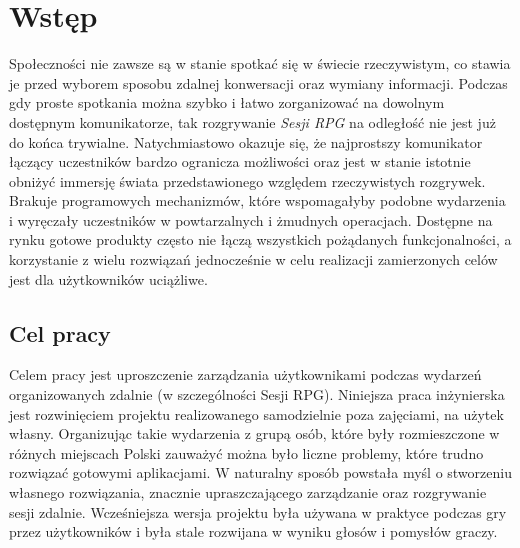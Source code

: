 \documentclass[shortabstract,inz]{iithesis}
\author{Mateusz Zając}
\begin{document}
	\chapter*{Wstęp}
		Społeczności nie zawsze są w stanie spotkać się w świecie rzeczywistym, co stawia je przed wyborem sposobu zdalnej konwersacji oraz wymiany informacji. Podczas gdy proste spotkania można szybko i łatwo zorganizować na dowolnym dostępnym komunikatorze, tak rozgrywanie \textit{Sesji RPG}\cite{sesjarpg} na odległość nie jest już do końca trywialne. Natychmiastowo okazuje się, że najprostszy komunikator łączący uczestników bardzo ogranicza możliwości oraz jest w stanie istotnie obniżyć immersję świata przedstawionego względem rzeczywistych rozgrywek. Brakuje programowych mechanizmów, które wspomagałyby podobne wydarzenia i wyręczały uczestników w powtarzalnych i żmudnych operacjach. Dostępne na rynku gotowe produkty często nie łączą wszystkich pożądanych funkcjonalności, a korzystanie z wielu rozwiązań jednocześnie w celu realizacji zamierzonych celów jest dla użytkowników uciążliwe. 
		
		\section*{Cel pracy}
		Celem pracy jest uproszczenie zarządzania użytkownikami podczas wydarzeń organizowanych zdalnie (w szczególności Sesji RPG).
		Niniejsza praca inżynierska jest rozwinięciem projektu realizowanego samodzielnie poza zajęciami, na użytek własny. Organizując takie wydarzenia z grupą osób, które były rozmieszczone w różnych miejscach Polski zauważyć można było liczne problemy, które trudno rozwiązać gotowymi aplikacjami. W naturalny sposób powstała myśl o stworzeniu własnego rozwiązania, znacznie upraszczającego zarządzanie oraz rozgrywanie sesji zdalnie. Wcześniejsza wersja projektu była używana w praktyce podczas gry przez użytkowników i była stale rozwijana w wyniku głosów i pomysłów graczy.
		
\end{document}
